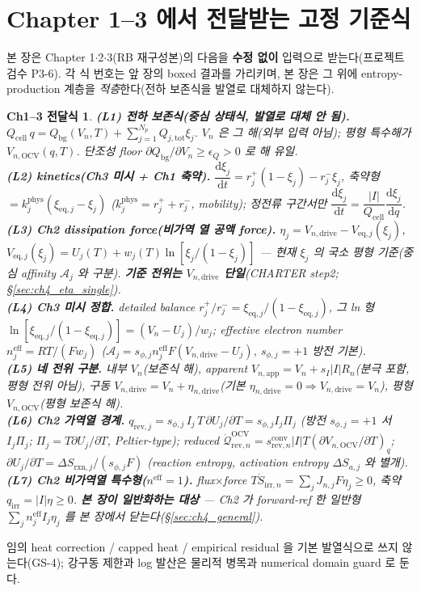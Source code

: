 \documentclass[11pt,a4paper]{article}
\newtheorem*{linkbox}{Ch1--3 전달식}
\newcommand{\dd}{\mathrm{d}}
\newcommand{\eff}{\mathrm{eff}}
\newcommand{\eq}{\mathrm{eq}}
\newcommand{\app}{\mathrm{app}}
\newcommand{\drive}{\mathrm{drive}}
\newcommand{\bg}{\mathrm{bg}}
\newcommand{\cell}{\mathrm{cell}}
\newcommand{\OCV}{\mathrm{OCV}}
\newcommand{\tot}{\mathrm{tot}}
\newcommand{\irr}{\mathrm{irr}}
\newcommand{\rev}{\mathrm{rev}}
\newcommand{\rxn}{\mathrm{rxn}}
\newcommand{\conv}{\mathrm{conv}}
\begin{document}
\section{Chapter 1--3 에서 전달받는 고정 기준식}\label{sec:ch4_inherit}
본 장은 Chapter 1$\cdot$2$\cdot$3(RB 재구성본)의 다음을 \textbf{수정 없이} 입력으로 받는다(프로젝트 검수 P3-6).
각 식 번호는 앞 장의 boxed 결과를 가리키며, 본 장은 그 위에 entropy-production 계층을 \emph{적층}한다(전하
보존식을 발열로 대체하지 않는다).
\begin{linkbox}
\textbf{(L1) 전하 보존식(중심 상태식, 발열로 대체 안 됨).} $Q_\cell\,q=Q_\bg(V_n,T)+\sum_{j=1}^{N_p}Q_{j,\tot}\xi_j$.
$V_n$ 은 그 해(외부 입력 아님); 평형 특수해가 $V_{n,\OCV}(q,T)$. 단조성 floor $\partial Q_\bg/\partial V_n\ge\epsilon_Q>0$
로 해 유일.\\
\textbf{(L2) kinetics(Ch3 미시 + Ch1 축약).} $\dfrac{\dd\xi_j}{\dd t}=r_j^+(1-\xi_j)-r_j^-\xi_j$, 축약형
$=k_j^{\mathrm{phys}}(\xi_{\eq,j}-\xi_j)$ ($k_j^{\mathrm{phys}}=r_j^++r_j^-$, mobility); 정전류 구간서만
$\dfrac{\dd\xi_j}{\dd t}=\dfrac{|I|}{Q_\cell}\dfrac{\dd\xi_j}{\dd q}$.\\
\textbf{(L3) Ch2 dissipation force(비가역 열 공액 force).} $\eta_j=V_{n,\drive}-V_{\eq,j}(\xi_j)$,
$V_{\eq,j}(\xi_j)=U_j(T)+w_j(T)\ln[\xi_j/(1-\xi_j)]$ — 현재 $\xi_j$ 의 \emph{국소 평형} 기준(중심 affinity
$\mathcal A_j$ 와 구분). \textbf{기준 전위는 $V_{n,\drive}$ 단일}(CHARTER step2; \S\ref{sec:ch4_eta_single}).\\
\textbf{(L4) Ch3 미시 정합.} detailed balance $r_j^+/r_j^-=\xi_{\eq,j}/(1-\xi_{\eq,j})$, 그 ln 형
$\ln[\xi_{\eq,j}/(1-\xi_{\eq,j})]=(V_n-U_j)/w_j$; effective electron number $n_j^{\eff}=RT/(Fw_j)$ ($\mathcal A_j
=s_{\phi,j}n_j^{\eff}F(V_{n,\drive}-U_j)$, $s_{\phi,j}=+1$ 방전 기본).\\
\textbf{(L5) 네 전위 구분.} 내부 $V_n$(보존식 해), apparent $V_{n,\app}=V_n+s_I|I|R_n$(분극 포함, 평형 전위
아님), 구동 $V_{n,\drive}=V_n+\eta_{n,\drive}$(기본 $\eta_{n,\drive}=0\Rightarrow V_{n,\drive}=V_n$), 평형
$V_{n,\OCV}$(평형 보존식 해).\\
\textbf{(L6) Ch2 가역열 경계.} $q_{\rev,j}=s_{\phi,j}\,I_j\,T\,\partial U_j/\partial T=s_{\phi,j}I_j\Pi_j$
(방전 $s_{\phi,j}=+1$ 서 $I_j\Pi_j$; $\Pi_j=T\partial U_j/\partial T$, Peltier-type); reduced $\dot{\mathcal Q}_{\rev,n}^{\OCV}=s_{\rev,n}^{\conv}|I|T(\partial V_{n,\OCV}/\partial T)_q$;
$\partial U_j/\partial T=\Delta S_{\rxn,j}/(s_{\phi,j}F)$ (reaction entropy, activation entropy $\Delta S_{a,j}$
와 별개).\\
\textbf{(L7) Ch2 비가역열 특수형($n^{\eff}=1$).} flux$\times$force $T\dot S_{\irr,n}=\sum_j J_{n,j}F\eta_j\ge0$,
축약 $q_\irr=|I|\eta\ge0$. \textbf{본 장이 일반화하는 대상} — Ch2 가 forward-ref 한 일반형 $\sum_j n_j^{\eff}I_j\eta_j$
를 본 장에서 닫는다(\S\ref{sec:ch4_general}).
\end{linkbox}
임의 heat correction / capped heat / empirical residual 을 기본 발열식으로 쓰지 않는다(GS-4); 강구동 제한과
log 발산은 물리적 병목과 numerical domain guard 로 둔다.
\end{document}
